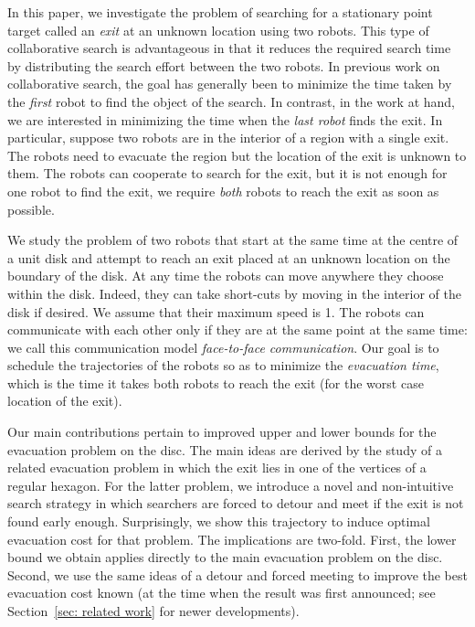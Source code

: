 \documentclass[
final
]{dmtcs-episciences}
\newcommand{\ff}{face-to-face }
\theoremstyle{definition}
\begin{document}
In this paper, we investigate the problem of searching for a stationary point target called an {\em exit} at an unknown location using two robots. 
This type of collaborative search is advantageous in that it reduces the required search time by distributing the search effort between the two robots. 
In previous work on collaborative search, the goal has generally been to minimize the time taken by the {\em first} robot to find the object of the search. 
In contrast, in the work at hand, we are interested in minimizing the time when the {\em last robot} finds the exit. 
In particular, suppose two robots are in the interior of a region with a single exit. 
The robots need to evacuate the region but the location of the exit is unknown to them. 
The robots can cooperate to search for the exit, but it is not enough for one robot to find the exit, we require {\em both} robots to reach  the exit as soon as possible. 

We study the problem of two robots that  start at the same time at the centre of a unit disk and attempt to reach an exit placed  at an unknown location on the boundary of the disk. 
At any time the robots can move anywhere they choose within the disk. 
Indeed, they can take short-cuts by moving in the interior of the disk if desired. 
We assume that their maximum speed is 1. 
The robots can communicate with each other only if they are at the same point at the same time: we call this communication model {\em \ff  communication}.  
Our goal is to schedule the trajectories of the robots so as to minimize the {\em evacuation time}, which is the time it takes both robots to reach the exit (for the worst case location of the exit). 

Our main contributions pertain to improved upper and lower bounds for the evacuation problem on the disc. The main ideas are derived by the study of a related evacuation problem in which the exit lies in one of the vertices of a regular hexagon. For the latter problem, we introduce a novel and non-intuitive search strategy in which searchers are forced to detour and meet if the exit is not found early enough. Surprisingly, we show this trajectory to induce optimal evacuation cost for that problem. The implications are two-fold. First, the lower bound we obtain applies directly to the main evacuation problem on the disc. Second, we use the same ideas of a detour and forced meeting to improve the best evacuation cost known (at the time when the result was first announced; see Section~\ref{sec: related work} for newer developments). 
\end{document}
